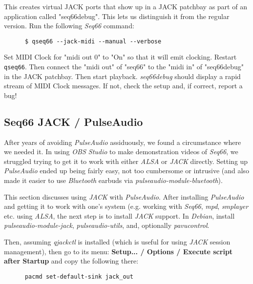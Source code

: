    This creates virtual JACK ports that show up in a JACK patchbay as part of
   an application called "seq66debug".  This lets us distinguish it from
   the regular version.  Run the following \textsl{Seq66} command:

   \begin{verbatim}
      $ qseq66 --jack-midi --manual --verbose
   \end{verbatim}

   Set MIDI Clock for "midi out 0" to "On" so that it will emit clocking.
   Restart \texttt{qseq66}.
   Then connect the "midi out" of "seq66" to the "midi in" of "seq66debug"
   in the JACK patchbay.
   Then start playback.
   \textsl{seq66debug} should display a rapid stream of MIDI Clock messages.
   If not, check the setup and, if correct, report a bug!

\subsection{Seq66 JACK / PulseAudio}
\label{subsec:jack_pulseaudio}

   After years of avoiding \textsl{PulseAudio} assiduously, we found a
   circumstance where we needed it.
   In using \textsl{OBS Studio} to make demonstration videos of \textsl{Seq66},
   we struggled trying to get it to work with either
   \textsl{ALSA} or \textsl{JACK} directly.
   Setting up \textsl{PulseAudio} ended up being fairly easy, not too
   cumbersome or intrusive (and also made it easier to use
   \textsl{Bluetooth} earbuds via \textsl{pulseaudio-module-bluetooth}).

   This section discusses using \textsl{JACK} with \textsl{PulseAudio}.
   After installing \textsl{PulseAudio} and getting it to work with one's
   system (e.g. working with \textsl{Seq66}, \textsl{mpd},
   \textsl{smplayer} etc. using \textsl{ALSA},
   the next step is to install \textsl{JACK} support.
   In \textsl{Debian}, install \textsl{pulseaudio-module-jack},
   \textsl{pulseaudio-utils}, and, optionally
   \textsl{pavucontrol}.

   Then, assuming \textsl{qjackctl} is installed (which is useful for using
   \textsl{JACK} session management), then go to its menu:
   \textbf{Setup... / Options / Execute script after Startup} and copy the
   following there:

   \begin{verbatim}
      pacmd set-default-sink jack_out
   \end{verbatim}

